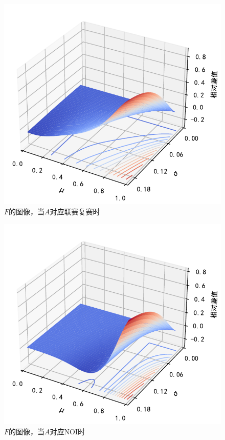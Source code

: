             \begin{figure}[p]
                \centering
                \includegraphics[width=\textwidth]{fig/plottingNoipD_1D_2WrtSigma.pdf}
                \caption{$F$的图像，当$A$对应联赛复赛时}
                \label{fig:plottingD_1D_2forNoipWrtSigma}
            \end{figure}

            \begin{figure}[p]
                \centering
                \includegraphics[width=\textwidth]{fig/plottingNoiD_1D_2WrtSigma.pdf}
                \caption{$F$的图像，当$A$对应NOI时}
                \label{fig:plottingD_1D_2forNoiWrtSigma}
            \end{figure}

